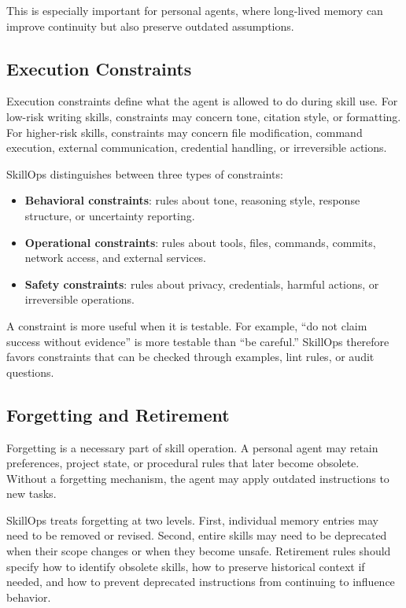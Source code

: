 \documentclass[11pt]{article}
\begin{document}
This is especially important for personal agents, where long-lived memory can
improve continuity but also preserve outdated assumptions.

\subsection{Execution Constraints}

Execution constraints define what the agent is allowed to do during skill use.
For low-risk writing skills, constraints may concern tone, citation style, or
formatting. For higher-risk skills, constraints may concern file modification,
command execution, external communication, credential handling, or irreversible
actions.

SkillOps distinguishes between three types of constraints:

\begin{itemize}[leftmargin=*]
    \item \textbf{Behavioral constraints}: rules about tone, reasoning style,
    response structure, or uncertainty reporting.
    \item \textbf{Operational constraints}: rules about tools, files, commands,
    commits, network access, and external services.
    \item \textbf{Safety constraints}: rules about privacy, credentials,
    harmful actions, or irreversible operations.
\end{itemize}

A constraint is more useful when it is testable. For example, ``do not claim
success without evidence'' is more testable than ``be careful.'' SkillOps
therefore favors constraints that can be checked through examples, lint rules,
or audit questions.

\subsection{Forgetting and Retirement}

Forgetting is a necessary part of skill operation. A personal agent may retain
preferences, project state, or procedural rules that later become obsolete.
Without a forgetting mechanism, the agent may apply outdated instructions to
new tasks.

SkillOps treats forgetting at two levels. First, individual memory entries may
need to be removed or revised. Second, entire skills may need to be deprecated
when their scope changes or when they become unsafe. Retirement rules should
specify how to identify obsolete skills, how to preserve historical context if
needed, and how to prevent deprecated instructions from continuing to influence
behavior.
\end{document}
